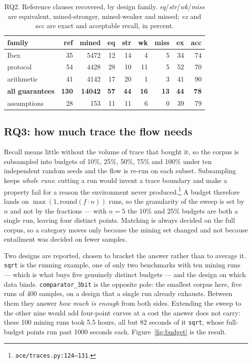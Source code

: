 \begin{table}[t]
\centering
\caption{RQ2. Reference clauses recovered, by design family.
\emph{eq}/\emph{str}/\emph{wk}/\emph{miss} are equivalent, mined-stronger, mined-weaker and
missed; \emph{ex} and \emph{acc} are exact and acceptable recall, in percent.}
\label{tab:rq2}
\begin{tabular}{lrrrrrrrr}
\toprule
family & ref & mined & eq & str & wk & miss & ex & acc \\
\midrule
Ibex & 35 & 5472 & 12 & 14 & 4 & 5 & 34 & 74 \\
protocol & 54 & 4428 & 28 & 10 & 11 & 5 & 52 & 70 \\
arithmetic & 41 & 4142 & 17 & 20 & 1 & 3 & 41 & 90 \\
\textbf{all guarantees} & \textbf{130} & \textbf{14042} & \textbf{57} & \textbf{44} & \textbf{16} & \textbf{13} & \textbf{44} & \textbf{78} \\
\midrule
assumptions & 28 & 153 & 11 & 11 & 6 & 0 & 39 & 79 \\
\bottomrule
\end{tabular}
\end{table}

\subsection{RQ3: how much trace the flow needs}
\label{sec:rq3}
Recall means little without the volume of trace that bought it, so the corpus is subsampled
into budgets of 10\%, 25\%, 50\%, 75\% and 100\% under ten independent random seeds and the
flow is re-run on each subset. Subsampling keeps \emph{whole runs}: cutting a run would invent
a trace boundary and make a property fail for a reason the environment never
produced.\footnote{\texttt{ace/traces.py:124--131}.} A budget therefore lands on
$\max(1,\mathrm{round}(f\cdot n))$ runs, so the granularity of the sweep is set by $n$ and not
by the fractions --- with $n=5$ the 10\% and 25\% budgets are both a single run, leaving four
distinct points. Matching is always decided on the full corpus, so a category moves only
because the mining set changed and not because entailment was decided on fewer samples.

Two designs are reported, chosen to bracket the answer rather than to average it. \texttt{sqrt}
is the running example, one of only two benchmarks with ten mining runs --- which is what buys
five genuinely distinct budgets --- and the design on which data binds. \texttt{comparator\_3bit}
is the opposite pole: the smallest corpus here, five runs of 400 samples, on a design that a
single run already exhausts. Between them they answer \emph{how much is enough} from both
sides. Extending the sweep to the other nine would add four-point curves at a cost the answer
does not carry: these 100 mining runs took 5.5 hours, all but 82 seconds of it \texttt{sqrt},
whose full-budget points run past 1000 seconds each. Figure~\ref{fig:budget} is the result.

